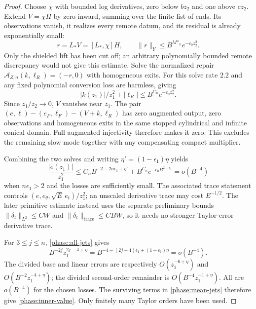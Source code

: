 \begin{proof}
Choose $\chi$ with bounded log derivatives, zero below $bz_2$ and one
above $cz_2$.  Extend $V=\chi H$ by zero inward, summing over the finite
list of ends.  Its observations vanish, it realizes every remote datum,
and its residual is already exponentially small:
\[
       r=L_*V=[L_*,\chi]H,\qquad
       \|r\|_Y\le B^{M''_n}e^{-c_0z_2^2}.
\]
Only the shielded lift has been cut off; an arbitrary polynomially
bounded remote discrepancy would not give this estimate.
Solve the normalized repair
$\mathcal A_{Z,n}(k,\ell_R)=(-r,0)$ with homogeneous exits.
For this solve rate $2.2$ and any fixed polynomial conversion loss are
harmless, giving
\[
        |k(z_1)|/z_1^2+|\ell_R|
                \le B^{C_n}e^{-c_0z_2^2}.
\]
Since $z_1/z_2\to0$, $V$ vanishes near $z_1$.
The pair $(e,\ell)-(e_F,\ell_F)-(V+k,\ell_R)$ has zero augmented
output, zero observations and homogeneous exits in the same stopped
cylindrical and infinite conical domain.  Full augmented injectivity
therefore makes it zero.  This excludes the remaining slow mode together
with any compensating compact multiplier.

Combining the two solves and writing $\eta'=(1-\epsilon_1)\eta$ yields
\[
 \frac{|e(z_1)|}{z_1^2}
 \le C_n B^{-2-2n\epsilon_1+\eta'}
          +B^{C_n}e^{-c_0B^{2-\epsilon_1}}=o(B^{-4})
\]
when $n\epsilon_1>2$ and the losses are sufficiently small.
The associated trace statement controls
$(e,e_\theta,\sqrt E\,e_t)/z_1^2$; an unscaled derivative trace may
cost $E^{-1/2}$.  The later primitive estimate instead uses the separate
preliminary bounds $\|\delta_t\|_{L^2}\le CW$ and
$\|\delta_t\|_{\mathrm{trace}}\le CBW$, so it needs no stronger
Taylor-error derivative trace.

For $3\le j\le n$, \eqref{phase:all-jets} gives
\[
 B^{-2j}z_1^{2j-4+\eta}
       =B^{-4-(2j-4)\epsilon_1+(1-\epsilon_1)\eta}=o(B^{-4}).
\]
The divided base and linear errors are respectively
$O(z_1^{-6+\eta})$ and $O(B^{-2}z_1^{-4+\eta})$; the divided
second-order remainder is $O(B^{-4}z_1^{-1+\eta})$.
All are $o(B^{-4})$ for the chosen losses.  The surviving terms in
\eqref{phase:mean-jets} therefore give \eqref{phase:inner-value}.
Only finitely many Taylor orders have been used.
\end{proof}

